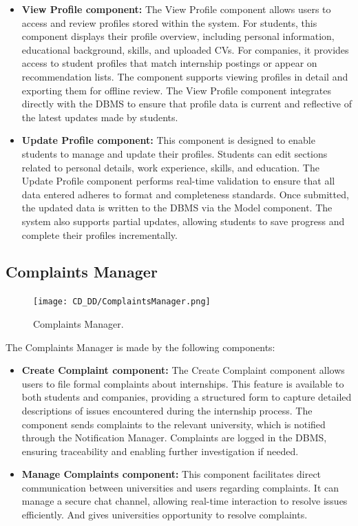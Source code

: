 \begin{itemize}
    \item \textbf{View Profile component:} The View Profile component allows users to access and review profiles stored within the system. For students, this component displays their profile overview, including personal information, educational background, skills, and uploaded CVs. For companies, it provides access to student profiles that match internship postings or appear on recommendation lists. The component supports viewing profiles in detail and exporting them for offline review. The View Profile component integrates directly with the DBMS to ensure that profile data is current and reflective of the latest updates made by students.
    \item \textbf{Update Profile component:} This component is designed to enable students to manage and update their profiles. Students can edit sections related to personal details, work experience, skills, and education. The Update Profile component performs real-time validation to ensure that all data entered adheres to format and completeness standards. Once submitted, the updated data is written to the DBMS via the Model component. The system also supports partial updates, allowing students to save progress and complete their profiles incrementally.
\end{itemize}

\subsection{Complaints Manager}
\label{subsec:complaints_manager}%

\begin{figure}[H]
    \begin{center}
        \texttt{[image: CD\_DD/ComplaintsManager.png]}
        \caption{Complaints Manager.}
        \label{fig:complaints_manager}%
    \end{center}
\end{figure}

\noindent The Complaints Manager is made by the following components:

\begin{itemize}
    \item \textbf{Create Complaint component:} The Create Complaint component allows users to file formal complaints about internships. This feature is available to both students and companies, providing a structured form to capture detailed descriptions of issues encountered during the internship process. The component sends complaints to the relevant university, which is notified through the Notification Manager. Complaints are logged in the DBMS, ensuring traceability and enabling further investigation if needed.
    \item \textbf{Manage Complaints component:} This component facilitates direct communication between universities and users regarding complaints. It can manage a secure chat channel, allowing real-time interaction to resolve issues efficiently. And gives universities opportunity to resolve complaints.
\end{itemize}

